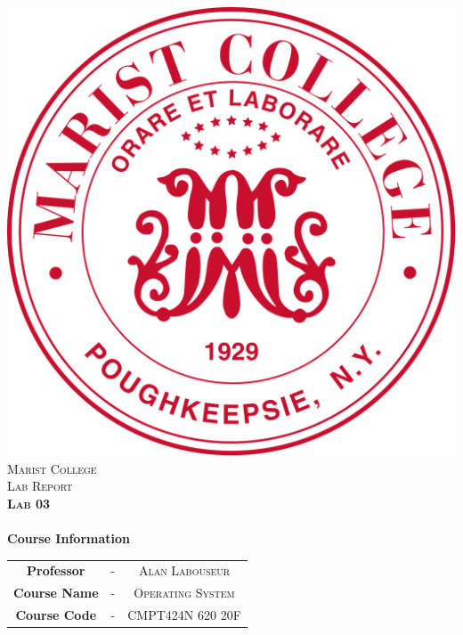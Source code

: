 \includegraphics[scale=0.15]{edit/logo.png}\\[1cm] %

\textsc{\LARGE Marist College}\\[1.5cm] %
\textsc{\Large Lab Report}\\[0.5cm]
\textsc{\Large \textbf{Lab 03}}\\[0.5cm]

\HRule \\[0.6cm]
{\Large\bfseries Course Information}\\[0.4cm] %
\begin{tabular}{c c c}
\large{\bfseries Professor} & - & \large{\textsc{Alan Labouseur}}\\ %
\large{\bfseries Course Name} & - & \large{\textsc{Operating System}}\\ %
\large{\bfseries Course Code} & - & \large{\textsc{CMPT424N 620 20F}}\\[7mm] %
\end{tabular}
\HRule \\[1.5cm]

